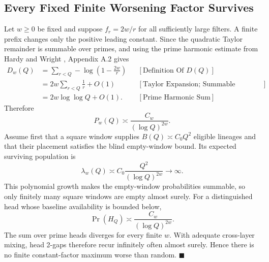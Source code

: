 \subsection{Every Fixed Finite Worsening Factor Survives}
Let $w\ge0$ be fixed and suppose $f_r=2w/r$ for all sufficiently large
filters. A finite prefix changes only the positive leading constant.
Since the quadratic Taylor remainder is summable over primes, and using
the prime harmonic estimate from Hardy and Wright \cite{hardywright2008},
Appendix A.2 gives
\begin{equation*}
\begin{aligned}
D_w(Q)
&=\sum_{r < Q}-\log\left(1-\frac{2w}{r}\right)
&&[\text{Definition Of }D(Q)]\\
&=2w\sum_{r < Q}\frac1r+O(1)
&&[\text{Taylor Expansion; Summable Remainder}]\\
&=2w\log\log Q+O(1).
&&[\text{Prime Harmonic Sum}]
\end{aligned}
\end{equation*}
Therefore
\begin{equation*}
P_w(Q)\asymp\frac{C_w}{(\log Q)^{2w}}.
\end{equation*}
Assume first that a square window supplies $B(Q)\asymp C_0Q^2$ eligible lineages and that their placement satisfies the blind empty-window bound. Its expected surviving population is
\begin{equation*}
\lambda_w(Q)
\asymp
C_0\frac{Q^2}{(\log Q)^{2w}}
\longrightarrow\infty.
\end{equation*}
This polynomial growth makes the empty-window probabilities summable, so only finitely many square windows are empty almost surely. For a distinguished head whose baseline availability is bounded below,
\begin{equation*}
\Pr(H_Q)\asymp\frac{C_w}{(\log Q)^{2w}}.
\end{equation*}
The sum over prime heads diverges for every finite $w$. With adequate cross-layer mixing, head 2-gaps therefore recur infinitely often almost surely. Hence there is no finite constant-factor maximum worse than random. $\blacksquare$
